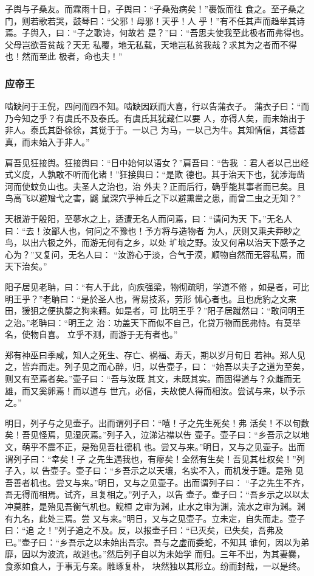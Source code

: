 \documentclass[]{article}
\begin{document}
子舆与子桑友。而霖雨十日，子舆曰：``子桑殆病矣！''裹饭而往
食之。至子桑之门，则若歌若哭，鼓琴曰：``父邪！母邪！天乎！人
乎！''有不任其声而趋举其诗焉。子舆入，曰：``子之歌诗，何故若
是？''曰：``吾思夫使我至此极者而弗得也。父母岂欲吾贫哉？天无
私覆，地无私载，天地岂私贫我哉？求其为之者而不得也！然而至此
极者，命也夫！''

\hypertarget{header-n2075}{%
\subsubsection{应帝王}\label{header-n2075}}

啮缺问于王倪，四问而四不知。啮缺因跃而大喜，行以告蒲衣子。
蒲衣子曰：``而乃今知之乎？有虞氏不及泰氏。有虞氏其犹藏仁以要
人，亦得人矣，而未始出于非人。泰氏其卧徐徐，其觉于于。一以己
为马，一以己为牛。其知情信，其德甚真，而未始入于非人。''

肩吾见狂接舆。狂接舆曰：``日中始何以语女？''肩吾曰：``告我
：君人者以己出经式义度，人孰敢不听而化诸！''狂接舆曰：``是欺
德也。其于治天下也，犹涉海凿河而使蚊负山也。夫圣人之治也，治
外夫？正而后行，确乎能其事者而已矣。且鸟高飞以避矰弋之害，鼷
鼠深穴乎神丘之下以避熏凿之患，而曾二虫之无知？''

天根游于殷阳，至蓼水之上，适遭无名人而问焉，曰：``请问为天
下。''无名人曰：``去！汝鄙人也，何问之不豫也！予方将与造物者
为人，厌则又乘夫莽眇之鸟，以出六极之外，而游无何有之乡，以处
圹埌之野。汝又何帛以治天下感予之心为？''又复问，无名人曰：
``汝游心于淡，合气于漠，顺物自然而无容私焉，而天下治矣。''

阳子居见老聃，曰：``有人于此，向疾强梁，物彻疏明，学道不倦
，如是者，可比明王乎？''老聃曰：``是於圣人也，胥易技系，劳形
怵心者也。且也虎豹之文来田，猨狙之便执嫠之狗来藉。如是者，可
比明王乎？''阳子居蹴然曰：``敢问明王之治。''老聃曰：``明王之
治：功盖天下而似不自己，化贷万物而民弗恃。有莫举名，使物自喜。
立乎不测，而游于无有者也。''

郑有神巫曰季咸，知人之死生、存亡、祸福、寿夭，期以岁月旬日
若神。郑人见之，皆弃而走。列子见之而心醉，归，以告壶子，曰：
``始吾以夫子之道为至矣，则又有至焉者矣。''壶子曰：``吾与汝既
其文，未既其实。而固得道与？众雌而无雄，而又奚卵焉！而以道与
世亢，必信，夫故使人得而相汝。尝试与来，以予示之。''

明日，列子与之见壶子。出而谓列子曰：``嘻！子之先生死矣！弗
活矣！不以旬数矣！吾见怪焉，见湿灰焉。''列子入，泣涕沾襟以告
壶子。壶子曰：``乡吾示之以地文，萌乎不震不正，是殆见吾杜德机
也。尝又与来。''明日，又与之见壶子。出而谓列子曰：``幸矣！子
之先生遇我也，有瘳矣！全然有生矣！吾见其杜权矣！''列子入，以
告壶子。壶子曰：``乡吾示之以天壤，名实不入，而机发于踵。是殆
见吾善者机也。尝又与来。''明日，又与之见壶子。出而谓列子曰：
``子之先生不齐，吾无得而相焉。试齐，且复相之。''列子入，以告
壶子。壶子曰：``吾乡示之以以太冲莫胜，是殆见吾衡气机也。鲵桓
之审为渊，止水之审为渊，流水之审为渊。渊有九名，此处三焉。尝
又与来。''明日，又与之见壶子。立未定，自失而走。壶子曰：``追
之！''列子追之不及。反，以报壶子曰：``已灭矣，已失矣，吾弗及
已。''壶子曰：``乡吾示之以未始出吾宗。吾与之虚而委蛇，不知其
谁何，因以为弟靡，因以为波流，故逃也。''然后列子自以为未始学
而归。三年不出，为其妻爨，食豕如食人，于事无与亲。雕琢复朴，
块然独以其形立。纷而封哉，一以是终。
\end{document}
